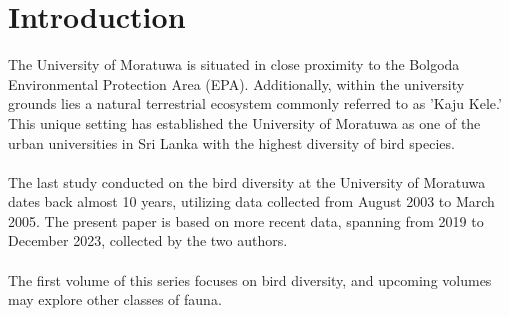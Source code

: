 \chapter{Introduction}
\label{cp:introduction}
The University of Moratuwa is situated in close proximity to the Bolgoda Environmental Protection Area (EPA). Additionally, within the university grounds lies a natural terrestrial ecosystem commonly referred to as 'Kaju Kele.' This unique setting has established the University of Moratuwa as one of the urban universities in Sri Lanka with the highest diversity of bird species.
\\\\
The last study conducted on the bird diversity at the University of Moratuwa dates back almost 10 years, utilizing data collected from August 2003 to March 2005. The present paper is based on more recent data, spanning from 2019 to December 2023, collected by the two authors.
\\\\
The first volume of this series focuses on bird diversity, and upcoming volumes may explore other classes of fauna.
